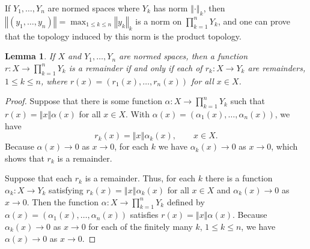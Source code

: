 \documentclass{article}
\newcommand{\norm}[1]{\left\Vert #1 \right\Vert}
\newtheorem{lemma}[theorem]{Lemma}
\theoremstyle{definition}
\begin{document}
If $Y_1,\ldots,Y_n$ are normed spaces where $Y_k$ has norm $\norm{\cdot}_k$, then 
$\norm{(y_1,\ldots,y_n)} = \max_{1 \leq k \leq n} \norm{y_k}_k$ is a norm
on $\prod_{k=1}^n Y_k$, and one can prove that the topology induced by this norm is the product
topology.

\begin{lemma}
If $X$ and $Y_1,\ldots,Y_n$ are normed spaces, then a function
$r:X \to \prod_{k=1}^n Y_k$ is a remainder
 if and only if 
each of $r_k:X \to Y_k$ are remainders, $1 \leq k \leq n$, where
 $r(x)=(r_1(x),\ldots,r_n(x))$ for all $x \in X$.
\end{lemma}
\begin{proof}
Suppose that there is some function $\alpha:X \to \prod_{k=1}^n Y_k$ such that
$r(x)=\norm{x} \alpha(x)$ for all $x \in X$. With $\alpha(x)=(\alpha_1(x),\ldots,\alpha_n(x))$, we have
\[
r_k(x)=\norm{x} \alpha_k(x), \qquad x \in X.
\]
Because $\alpha(x) \to 0$ as $x \to 0$, for each $k$ we have $\alpha_k(x) \to 0$ as $x \to 0$, which shows that
$r_k$ is a remainder.

Suppose that each $r_k$ is a remainder. Thus, for each $k$ there is a function $\alpha_k:X \to Y_k$
satisfying $r_k(x)=\norm{x} \alpha_k(x)$ for all $x \in X$ and $\alpha_k(x) \to 0$ as $x \to 0$. Then the function
$\alpha:X \to \prod_{k=1}^n Y_k$ defined by $\alpha(x)=(\alpha_1(x),\ldots,\alpha_n(x))$ satisfies
$r(x)=\norm{x} \alpha(x)$. Because $\alpha_k(x) \to 0$ as $x \to 0$ for each of the finitely many $k$, $1 \leq k \leq n$, 
we have $\alpha(x) \to 0$ as $x \to 0$.
\end{proof}
\end{document}
